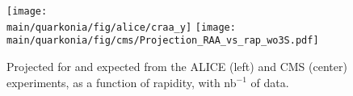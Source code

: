 \documentclass[../report.tex]{subfiles}
\providecommand{\main}{..}
\begin{document}
\begin{figure}
\begin{center}
 \texttt{[image: \\main/quarkonia/fig/alice/craa\_y]}
 \texttt{[image: \\main/quarkonia/fig/cms/Projection\_RAA\_vs\_rap\_wo3S.pdf]}
\end{center}

 \caption{Projected \raa for  and  expected from the ALICE (left) and CMS (center) experiments, as a function of rapidity, with \unit[10]{nb}$^{-1}$ of \PbPb data.
 }
 \label{fig:upsi_raa_y}
\end{figure}
\end{document}

